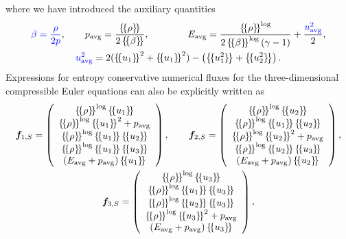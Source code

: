 \documentclass[review,onefignum,onetabnum,final]{siamart171218}
\newcommand{\nor}[1]{\left\| #1 \right\|}
\newcommand{\LRp}[1]{\left( #1 \right)}
\newcommand{\LRc}[1]{\left\{ #1 \right\}}
\newcommand{\note}[1]{{\color{blue}{#1}}}
\newcommand{\avg}[1] {\ensuremath{\LRc{\!\{#1\}\!}}}
\begin{document}
where we have introduced the auxiliary quantities 
\begin{gather}
\note{\beta = \frac{\rho}{2p}}, \qquad p_{\rm avg} = \frac{\avg{\rho}}{2\avg{\beta}}, \qquad \qquad E_{\rm avg} = \frac{\avg{\rho}^{\log}}{2\avg{\beta}^{\log}\LRp{\gamma -1}}   + \frac{\note{u_{\rm avg}^2}}{2}, \label{eq:fluxaux} \\
\note{u^2_{\rm avg}} = 2(\avg{u_1}^2 + \avg{u_1}^2) - \LRp{\avg{u_1^2} +\avg{u_2^2}} \nonumber.  
\end{gather}
Expressions for entropy conservative numerical fluxes for the three-dimensional compressible Euler equations can also be explicitly written as
\begin{gather*}
\bm{f}_{1,S} = \LRp{\begin{array}{c}
\avg{\rho}^{\log}\avg{u_1}\\
\avg{\rho}^{\log}\avg{u_1}^2 + p_{\rm avg}\\
\avg{\rho}^{\log}\avg{u_1}\avg{u_2}\\
\avg{\rho}^{\log}\avg{u_1}\avg{u_3}\\
(E_{\rm avg}+ p_{\rm avg})\avg{u_1}\\
\end{array}}, 
\qquad 
\bm{f}_{2,S} = \LRp{\begin{array}{c}
\avg{\rho}^{\log}\avg{u_2}\\
\avg{\rho}^{\log}\avg{u_1}\avg{u_2}\\
\avg{\rho}^{\log}\avg{u_2}^2 + p_{\rm avg}\\
\avg{\rho}^{\log}\avg{u_2}\avg{u_3}\\
(E_{\rm avg}+ p_{\rm avg})\avg{u_2}\\
\end{array}},\\
\bm{f}_{3,S} = \LRp{\begin{array}{c}
\avg{\rho}^{\log}\avg{u_3}\\
\avg{\rho}^{\log}\avg{u_1}\avg{u_3}\\
\avg{\rho}^{\log}\avg{u_2}\avg{u_3}\\
\avg{\rho}^{\log}\avg{u_3}^2 + p_{\rm avg}\\
(E_{\rm avg}+ p_{\rm avg})\avg{u_3}\\
\end{array}},\nonumber
\end{gather*}
\end{document}
